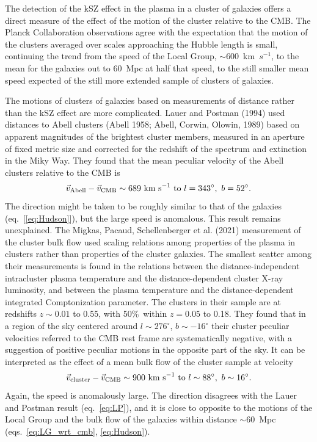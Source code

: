 \documentclass[fleqn,12pt]{article}
\newcommand{\beq}{\begin{equation}}
\newcommand{\eeq}{\end{equation}}
\begin{document}
The detection of the kSZ effect in the plasma in a cluster of galaxies offers a direct measure of the effect of the motion of the cluster relative to the CMB. The Planck Collaboration observations agree with the expectation that the motion of the clusters averaged over scales approaching the Hubble length is small, continuing the trend from the speed of the Local Group, $\sim 600$~km~$s^{-1}$, to the mean for the galaxies out to 60~Mpc at half that speed, to the still smaller mean speed expected of the still more extended sample of clusters of galaxies. 

The motions of clusters of galaxies based on measurements of distance rather than the kSZ effect are more complicated. Lauer and Postman (1994) used distances to Abell clusters  (Abell 1958; Abell, Corwin, Olowin, 1989) based on apparent magnitudes of the brightest cluster members, measured in an aperture of fixed metric size and corrected for the redshift of the spectrum and extinction in the Miky Way. They found that the mean peculiar velocity of the Abell clusters relative to the CMB is
\beq
{\vec v}_{\rm Abell} - {\vec v}_{\rm CMB} \sim 689\hbox{ km s}^{-1}\hbox{ to } l = 343^\circ ,\ b = 52^\circ.\label{eq:LP}
\eeq
The direction might be taken to be roughly similar to that of the galaxies (eq.~[\ref{eq:Hudson}]), but the large speed is anomalous. This result remains unexplained. The Migkas, Pacaud, Schellenberger et al. (2021) measurement of the cluster bulk flow used scaling relations among properties of the plasma in clusters rather than properties of the cluster galaxies. The smallest scatter among their measurements is found in the relations between the distance-independent intracluster plasma temperature and the distance-dependent cluster X-ray luminosity,  and between the plasma temperature and the distance-dependent integrated Comptonization parameter. The clusters in their sample are at redshifts $z\sim 0.01$ to 0.55, with 50\%\ within $z=0.05$ to 0.18. They found that in a region of the sky centered around $l\sim 276^\circ$, $b \sim -16^\circ$ their cluster peculiar velocities referred to the CMB rest frame are systematically negative, with a suggestion of positive peculiar motions in the opposite part of the sky. It can be interpreted as the effect of a mean bulk flow of the cluster sample at velocity
\beq
{\vec v}_{\rm cluster} - {\vec v}_{\rm CMB} \sim 900\hbox{ km s}^{-1}\hbox{ to } l \sim 88^\circ,\ b \sim 16^\circ.\label{eq:Migkasetal}
\eeq
Again, the speed is anomalously large. The direction disagrees with the Lauer and Postman result (eq.~\ref{eq:LP}), and it is close to opposite to the motions of the Local Group and the bulk flow of the galaxies within distance $\sim 60$~Mpc (eqs.~\ref{eq:LG_wrt_cmb}, \ref{eq:Hudson}).
\end{document}
